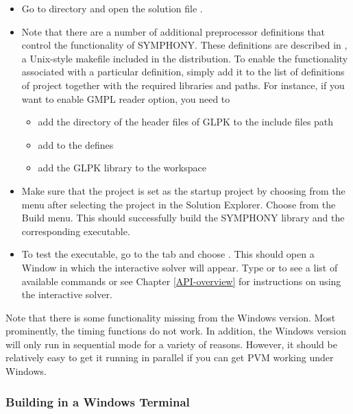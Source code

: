 \begin{itemize}

\item Go to  directory and open the solution file
. 

\item Note that there are a number of additional preprocessor definitions that
control the functionality of SYMPHONY. These definitions are described in
, a Unix-style makefile included in the distribution. To 
enable the functionality associated with a particular definition, simply add 
it to the list of definitions of  project together with 
the required libraries and paths. For instance, if you 
want to enable GMPL reader option, you need to
\begin{itemize}
  \item add the directory of the header files of GLPK to the include 
files path
  \item add  to the defines
  \item add the GLPK library to the workspace
\end{itemize}
\item Make sure that the project  is set as the startup project
by choosing  from the  menu after
selecting the  project in the Solution Explorer. Choose
 from the Build menu. This should successfully build
the SYMPHONY library and the corresponding executable.

\item To test the executable, go to the  tab and choose
. This should open a Window in which the
interactive solver will appear. Type  or  to see a list of
available commands or see Chapter \ref{API-overview} for instructions on using
the interactive solver.

\end{itemize}

Note that there is some functionality missing from the Windows version. Most
prominently, the timing functions do not work. In addition, the Windows
version will only run in sequential mode for a variety of reasons. However, it
should be relatively easy to get it running in parallel if you can get PVM
working under Windows. 

\subsubsection{Building in a Windows Terminal}
\label{using_msdev}


